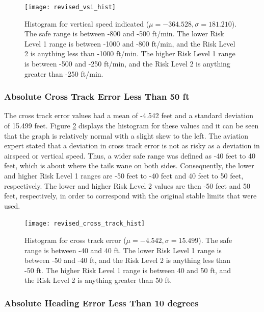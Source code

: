 		\begin{figure}[t]
			\centering
            \texttt{[image: revised\_vsi\_hist]}
            \caption{Histogram for vertical speed indicated ($\mu = -364.528, \sigma = 181.210$).  The safe range is between -800 and -500 ft/min.  The lower Risk Level 1 range is between -1000 and -800 ft/min, and the Risk Level 2 is anything less than -1000 ft/min.  The higher Risk Level 1 range is between -500 and -250 ft/min, and the Risk Level 2 is anything greater than -250 ft/min.}
            \label{fig:revised_vsi_hist}
		\end{figure}



    \subsubsection{Absolute Cross Track Error Less Than 50 ft}
    
    	The cross track error values had a mean of -4.542 feet and a standard deviation of 15.499 feet.  Figure \ref{fig:revised_cross_track_hist} displays the histogram for these values and it can be seen that the graph is relatively normal with a slight skew to the left.  The aviation expert stated that a deviation in cross track error is not as risky as a deviation in airspeed or vertical speed.  Thus, a wider safe range was defined as -40 feet to 40 feet, which is about where the tails wane on both sides.  Consequently, the lower and higher Risk Level 1 ranges are -50 feet to -40 feet and 40 feet to 50 feet, respectively.  The lower and higher Risk Level 2 values are then -50 feet and 50 feet, respectively, in order to correspond with the original stable limits that were used.
        
		\begin{figure}[t]
			\centering
            \texttt{[image: revised\_cross\_track\_hist]}
            \caption{Histogram for cross track error ($\mu = -4.542, \sigma = 15.499$).  The safe range is between -40 and 40 ft.  The lower Risk Level 1 range is between -50 and -40 ft, and the Risk Level 2 is anything less than -50 ft.  The higher Risk Level 1 range is between 40 and 50 ft, and the Risk Level 2 is anything greater than 50 ft.}
            \label{fig:revised_cross_track_hist}
		\end{figure}



    \subsubsection{Absolute Heading Error Less Than 10 degrees}
    
